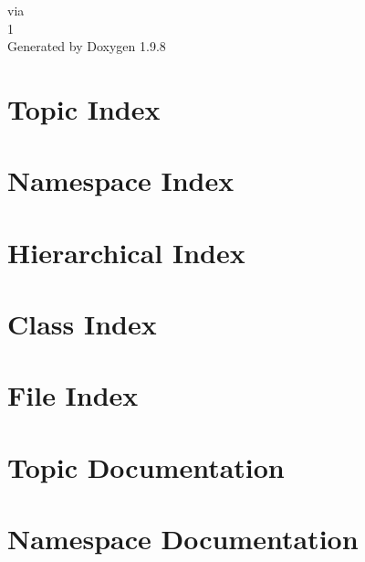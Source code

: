 \documentclass[twoside]{book}
\newcommand{\+}{\discretionary{\mbox{\scriptsize$\hookleftarrow$}}{}{}}
\newcommand{\clearemptydoublepage}{%
    \newpage{\pagestyle{empty}\cleardoublepage}%
  }
\begin{document}
  \raggedbottom
    \hypersetup{pageanchor=false,
                bookmarksnumbered=true,
                pdfencoding=unicode
               }
  \begin{titlepage}
  \vspace*{7cm}
  \begin{center}%
  {\Large via}\\
  [1ex]\large 1 \\
  \vspace*{1cm}
  {\large Generated by Doxygen 1.9.8}\\
  \end{center}
  \end{titlepage}
  \clearemptydoublepage
  \tableofcontents
  \clearemptydoublepage
  \hypersetup{pageanchor=true}

\chapter{Topic Index}

\chapter{Namespace Index}

\chapter{Hierarchical Index}

\chapter{Class Index}

\chapter{File Index}

\chapter{Topic Documentation}



\chapter{Namespace Documentation}


\end{document}
